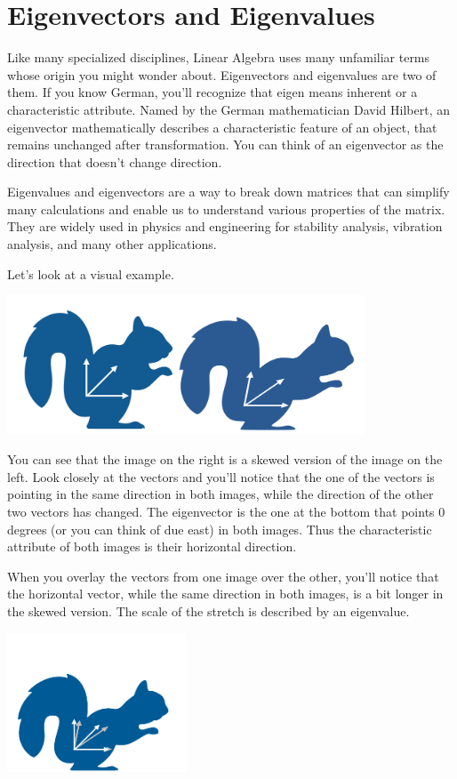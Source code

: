 \chapter{Eigenvectors and Eigenvalues}


Like many specialized disciplines, Linear Algebra uses many unfamiliar terms whose origin you might wonder about. Eigenvectors and eigenvalues are two of them. If you know German, you’ll recognize that eigen means inherent or a characteristic attribute. Named by the German mathematician David Hilbert, an eigenvector mathematically describes a characteristic feature of an object, that remains unchanged after transformation. You can think of an eigenvector as the direction that doesn’t change direction. 

Eigenvalues and eigenvectors are a way to break down matrices that can simplify many calculations and enable us to understand various properties of the matrix. They are widely used in physics and engineering for stability analysis, vibration analysis, and many other applications.  

Let’s look at a visual example.

\includegraphics[width=0.8\textwidth]{eigensquirrel.png}

You can see that the  image on the right is a skewed version of the image on the left. Look closely at the vectors and you’ll notice that the one of the vectors is pointing in the same direction in both images, while the direction of the other two vectors has changed. The eigenvector is the one at the bottom that points 0 degrees (or you can think of due east) in both images. Thus the characteristic attribute of both images is their horizontal direction.

When you overlay the vectors from one image over the other, you’ll notice that the horizontal vector, while the same direction in both images, is a bit longer in the skewed version. The scale of the stretch is described by an eigenvalue.

\includegraphics[width=0.4\textwidth]{overlaysquirrel.png}


